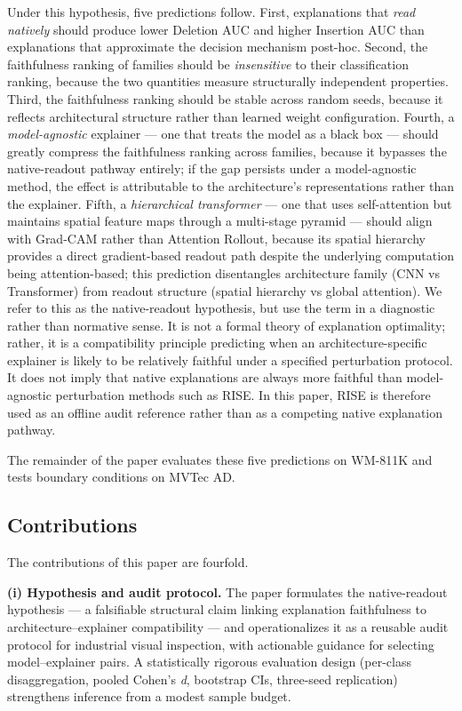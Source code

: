 \documentclass[11pt,a4paper]{article}
\begin{document}
Under this hypothesis, five predictions follow. First, explanations that \emph{read natively} should produce lower Deletion AUC and higher Insertion AUC than explanations that approximate the decision mechanism post-hoc. Second, the faithfulness ranking of families should be \emph{insensitive} to their classification ranking, because the two quantities measure structurally independent properties. Third, the faithfulness ranking should be stable across random seeds, because it reflects architectural structure rather than learned weight configuration. Fourth, a \emph{model-agnostic} explainer --- one that treats the model as a black box --- should greatly compress the faithfulness ranking across families, because it bypasses the native-readout pathway entirely; if the gap persists under a model-agnostic method, the effect is attributable to the architecture's representations rather than
the explainer. Fifth, a \emph{hierarchical transformer} --- one that uses self-attention but maintains spatial feature maps through a multi-stage pyramid --- should align with Grad-CAM rather than Attention Rollout, because its spatial hierarchy provides a direct gradient-based readout path despite the underlying computation being attention-based; this prediction disentangles architecture family (CNN vs Transformer) from readout structure (spatial hierarchy vs global attention). We refer to this as the native-readout hypothesis, but use the term in a diagnostic rather than normative sense. It is not a formal theory of explanation optimality; rather, it is a compatibility principle predicting when an architecture-specific explainer is likely to be relatively faithful under a specified perturbation protocol. It does not imply that native explanations are always more faithful than
model-agnostic perturbation methods such as RISE. In this paper, RISE is therefore used as an offline audit reference rather than as a competing native explanation pathway.

The remainder of the paper evaluates these five predictions on WM-811K and tests boundary conditions on MVTec AD.

\subsection{Contributions}

The contributions of this paper are fourfold.

\textbf{(i) Hypothesis and audit protocol.} The paper formulates the native-readout hypothesis --- a falsifiable structural claim linking explanation faithfulness to architecture--explainer compatibility --- and operationalizes it as a reusable audit protocol for industrial visual inspection, with actionable guidance for selecting model--explainer pairs. A statistically rigorous evaluation design (per-class disaggregation, pooled Cohen's \emph{d}, bootstrap CIs, three-seed replication) strengthens inference from a modest sample budget.
\end{document}
